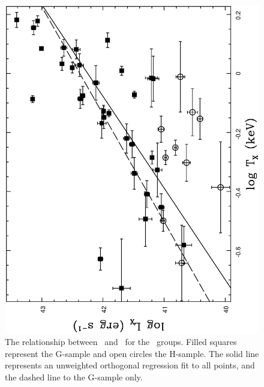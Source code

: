 \documentclass[usenatbib]{mn2e}
\begin{document}
\begin{figure}
  \begin{minipage}{241pt} 

    \includegraphics[height=\linewidth,angle=270]{fig_12.ps}
    \caption{The relationship between \LX\ and \TX\ for the \GEMS\ groups.  Filled
             squares represent the G-sample and open circles the H-sample.  The
             solid line represents an unweighted orthogonal regression fit to all
             points, and the dashed line to the G-sample only.}
    \label{fig_LX_TX}

  \end{minipage}\hspace{18pt}
  \begin{minipage}{241pt}


\end{minipage}
\end{figure}
\end{document}
